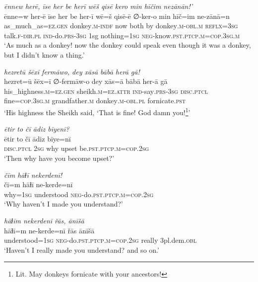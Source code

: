\ea \label{HB.84}
\textit{ēnnew herē, īse her be herī wēš qisē kero min hīčim nezānān!’} \\ 
\gll ēnne=w her-ē īse her be her-ī wē=š qisē-ē ∅-ker-o min hīč=im ne-zānā=n \\ 
 as\_much\_as\textsc{=ez}\textsc{.gen} donkey\textsc{.m}\textsc{-indf} now both by donkey\textsc{.m}\textsc{-obl}\textsc{.m} \textsc{reflx}\textsc{=3sg} talk\textsc{\textsc{.f}}\textsc{-dir}\textsc{.pl} \textsc{ind-}do\textsc{.prs}\textsc{-3sg} 1sg nothing\textsc{=1sg} \textsc{neg-}know\textsc{.pst}\textsc{.ptcp}\textsc{.m}\textsc{=cop}\textsc{.3sg}\textsc{.m} \\ 
\glt `As much as a donkey! now the donkey could speak even though it was a donkey, but I didn’t know a thing.'
\z 
 
\ea \label{HB.85}
\textit{hezretū šēxī fermāwo, dey xāsā bābā herā gā!} \\ 
\gll hezret=ū šēx=ī ∅-fermāw-o dey xās=ā bābā her-ā gā \\ 
 his\_highness\textsc{.m}\textsc{=ez}\textsc{.gen} sheikh\textsc{.m}\textsc{=ez}.\textsc{attr} \textsc{ind-}say\textsc{.prs}\textsc{-3sg} \textsc{disc.ptcl} fine\textsc{=cop}\textsc{.3sg}\textsc{.m} grandfather\textsc{.m} donkey\textsc{.m}\textsc{-obl}\textsc{.pl} fornicate\textsc{.pst} \\ 
\glt `His highness the Sheikh said, ‘That is fine! God damn you!\footnote{Lit. May donkeys fornicate with your ancestors!}'
\z 
 
\ea \label{HB.89}
\textit{ētir to čī ādiz bīyenī?} \\ 
\gll ētir to čī ādiz bīye=nī \\ 
 \textsc{disc.ptcl} \textsc{2sg} why upset be\textsc{.pst}\textsc{.ptcp}\textsc{.m}\textsc{=cop}\textsc{.\textsc{2sg}} \\ 
\glt `Then why have you become upset?'
\z 
 
\ea \label{HB.92}
\textit{čīm hāɫī nekerdenī!} \\ 
\gll čī=m hāɫī ne-kerde=nī \\ 
 why\textsc{=1sg} understood \textsc{neg-}do\textsc{.pst}\textsc{.ptcp}\textsc{.m}\textsc{=cop}\textsc{.\textsc{2sg}} \\ 
\glt `Why haven’t I made you understand?'
\z 
 
\ea \label{HB.93}
\textit{hāɫīm nekerdenī řās, ānīšā} \\ 
\gll hāɫī=m ne-kerde=nī řās ānīšā \\ 
 understood\textsc{=1sg} \textsc{neg-}do\textsc{.pst}\textsc{.ptcp}\textsc{.m}\textsc{=cop}\textsc{.\textsc{2sg}} really 3pl.dem\textsc{.obl} \\ 
\glt `Haven’t I really made you understand? and so on.'
\z 



